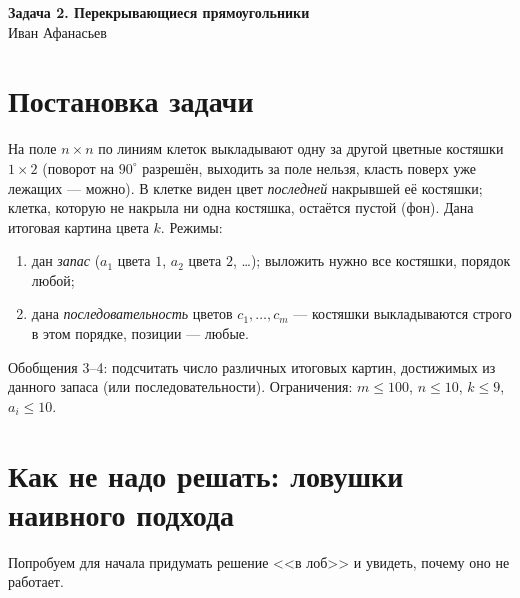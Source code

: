\documentclass[12pt,a4paper]{article}
\begin{document}
\sloppy

\begin{center}
  {\LARGE\bfseries Задача 2. Перекрывающиеся прямоугольники}\\[4pt]
  {\large Иван Афанасьев}\\[2pt]
\end{center}

\vspace{6pt}
\begin{center}
\end{center}
\vspace{10pt}

\section{Постановка задачи}

На поле $n\times n$ по линиям клеток выкладывают одну за другой цветные
костяшки $1\times2$ (поворот на $90^{\circ}$ разрешён, выходить за поле
нельзя, класть поверх уже лежащих --- можно). В клетке виден цвет
\emph{последней} накрывшей её костяшки; клетка, которую не накрыла ни
одна костяшка, остаётся пустой (фон). Дана итоговая картина цвета $k$.
Режимы:
\begin{enumerate}
  \item дан \emph{запас} ($a_1$ цвета $1$, $a_2$ цвета $2$, \dots);
        выложить нужно все костяшки, порядок любой;
  \item дана \emph{последовательность} цветов $c_1,\dots,c_m$ ---
        костяшки выкладываются строго в этом порядке, позиции --- любые.
\end{enumerate}
Обобщения 3--4: подсчитать число различных итоговых картин, достижимых
из данного запаса (или последовательности). Ограничения:
$m\le100$, $n\le10$, $k\le9$, $a_i\le10$.

\section{Как не надо решать: ловушки наивного подхода}

Попробуем для начала придумать решение <<в лоб>> и увидеть, почему оно
не работает.
\end{document}
